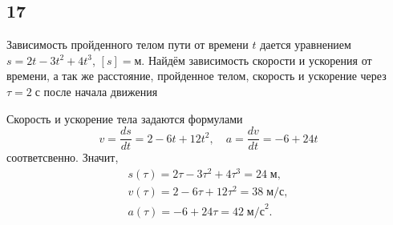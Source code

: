 \subsection{17}

Зависимость пройденного телом пути от времени $t$ дается уравнением $s=2t-3t^2+4t^3$, $[s]=\text{м}$. Найдём зависимость скорости и ускорения от времени, а так же расстояние, пройденное телом, скорость и ускорение через $\tau=2\;\text{с}$ после начала
движения

Скорость и ускорение тела задаются формулами
\[
v=\frac{ds}{dt}=2-6t+12t^2,\quad a=\frac{dv}{dt}=-6+24t
\]
соответсвенно. Значит,
\begin{gather*}
s(\tau)=2\tau-3\tau^2+4\tau^3=24\;\text{м}, \\
v(\tau)=2-6\tau+12\tau^2=38\;\text{м/с}, \\
a(\tau)=-6+24\tau=42\;\text{м/с}^2.
\end{gather*}